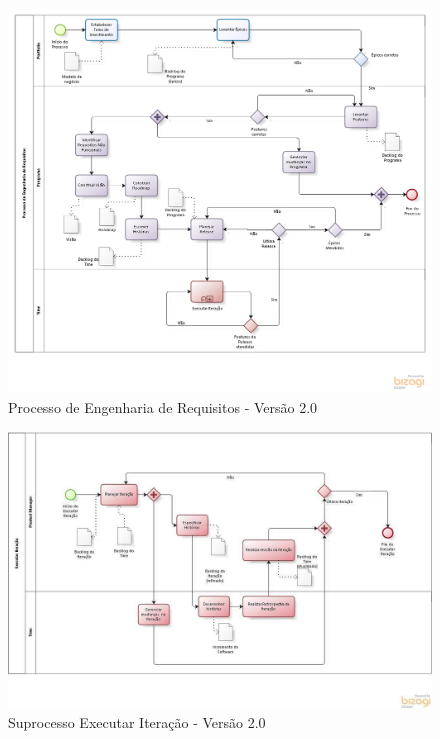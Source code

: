 \pagebreak
\begin{figure}[!htb]
\flushleft
\includegraphics[scale=0.6]{figuras/processo3.png}
\caption{Processo de Engenharia de Requisitos - Versão 2.0}
\label{fig:Processo}
\end{figure}

\begin{figure}[!htb]
\flushleft
\includegraphics[scale=0.4]{figuras/iteracao2.png}
\caption{Suprocesso Executar Iteração - Versão 2.0}
\label{fig:iteracao}
\end{figure}

\pagebreak


% 
% 
% 